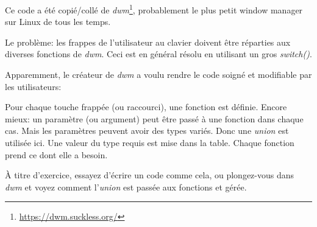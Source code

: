 
Ce code a été copié/collé de \emph{dwm}\footnote{\url{https://dwm.suckless.org/}},
probablement le plus petit window manager sur Linux de tous les temps.

Le problème: les frappes de l'utilisateur au clavier doivent être réparties aux diverses
fonctions de \emph{dwm}.
Ceci est en général résolu en utilisant un gros \emph{switch()}.


Apparemment, le créateur de \emph{dwm} a voulu rendre le code soigné et modifiable
par les utilisateurs:



Pour chaque touche frappée (ou raccourci), une fonction est définie.
Encore mieux: un paramètre (ou argument) peut être passé à une fonction dans chaque
cas.
Mais les paramètres peuvent avoir des types variés.
Donc une \emph{union} est utilisée ici.
Une valeur du type requis est mise dans la table.
Chaque fonction prend ce dont elle a besoin.

À titre d'exercice, essayez d'écrire un code comme cela, ou plongez-vous dans \emph{dwm}
et voyez comment l'\emph{union} est passée aux fonctions et gérée.

